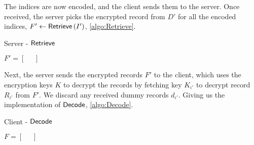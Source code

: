 The indices are now encoded, and the client sends them to the server. Once received, the server picks the encrypted record from $ D' $ for all the encoded indices, $ F' \gets \mathsf{{Retrieve}} \left( I' \right) $, \cref{algo:Retrieve}.

\hfill

\begin{algorithm}[H]
    \LinesNumbered
    \caption{Server - $ \mathsf{{Retrieve}} $}
    \label{algo:Retrieve}

    \vspace*{0.48cm}

    $ F' = \left[ \phantom{=} \right] $


    \vspace*{0.48cm}

\end{algorithm}

\hfill

Next, the server sends the encrypted records $ F' $ to the client, which uses the encryption keys $ K $ to decrypt the records by fetching key $ K_{\iota'} $ to decrypt record $ R_{\iota'} $ from $ F' $. We discard any received dummy records $ d_{\iota'} $. Giving us the implementation of $ \mathsf{{Decode}} $, \cref{algo:Decode}.

\hfill

\begin{algorithm}[H]
    \LinesNumbered
    \caption{Client - $ \mathsf{{Decode}} $}
    \label{algo:Decode}

    \vspace*{0.48cm}

    $ F = \left[ \phantom{=} \right] $


    \vspace*{0.48cm}

\end{algorithm}
